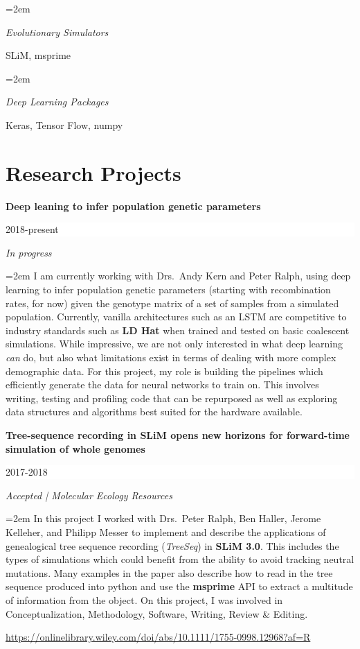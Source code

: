 \documentclass[paper=a4,fontsize=11pt]{scrartcl} %
\newlength{\spacebox}
\newcommand{\sepspace}{\vspace*{1em}}		%
\newcommand{\PersonalEntry}[2]{
		\noindent\hangindent=2em\hangafter=0 %
		\parbox{\spacebox}{        %
		\textit{#1}}		       %
		\hspace{1.5em} #2 \par}    %
\newcommand{\SkillsEntry}[2]{      %
		\noindent\hangindent=2em\hangafter=0 %
		\parbox{\spacebox}{        %
		\textit{#1}}			   %
		\hspace{1.5em} #2 \par}    %
\newcommand{\EducationEntry}[4]{
		\noindent \textbf{#1} \hfill      %
		\colorbox{White}{%
			\parbox{6em}{%
			\hfill\color{Black}#2}} \par  %
		\noindent \textit{#3} \par        %
		\noindent\hangindent=2em\hangafter=0 \small #4 %
		\normalsize \par}
\begin{document}
\SkillsEntry{Evolutionary Simulators}{SLiM, msprime}
\sepspace

\SkillsEntry{Deep Learning Packages}{Keras, Tensor Flow, numpy}
\sepspace

\section*{Research Projects}{}
\EducationEntry{Deep leaning to infer population genetic parameters}{2018-present}{In progress}
{I am currently working with Drs.\ Andy Kern and Peter Ralph, using deep learning to infer population genetic parameters 
(starting with recombination rates, for now) given the
genotype matrix of a set of samples from a simulated population.  Currently, vanilla architectures
such as an LSTM are competitive to industry standards such as \textbf{LD Hat} when trained and tested 
on basic coalescent simulations. While impressive, we are not only interested in what deep learning \textit{can} do, 
but also what limitations exist in terms of dealing with more complex demographic data.
For this project, my role is building the pipelines which efficiently generate the data for neural networks to train on.
This involves writing, testing and profiling code that can be repurposed
 as well as exploring data structures and algorithms best suited for the hardware available. 
}
\sepspace

\EducationEntry{Tree-sequence recording in SLiM opens new horizons for forward-time simulation of whole genomes}{2017-2018}{Accepted | Molecular Ecology Resources}
{In this project I worked with Drs.\ Peter Ralph, Ben Haller, Jerome Kelleher, and Philipp Messer to 
implement and describe the applications of genealogical tree sequence recording (\textit{TreeSeq}) in \textbf{SLiM 3.0}.
This includes the types of simulations which could benefit from the ability to avoid tracking neutral mutations.
Many examples in the paper also describe how to read in the tree sequence produced into python and use the
\textbf{msprime} API to extract a multitude of information from the object. On this project, I was involved in  
Conceptualization, Methodology, Software, Writing, Review \& Editing. 
}
\url{https://onlinelibrary.wiley.com/doi/abs/10.1111/1755-0998.12968?af=R}
\sepspace
\end{document}
